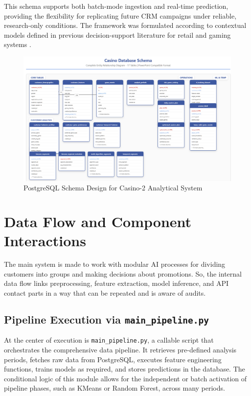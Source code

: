 \documentclass[12pt,a4paper]{report}
\begin{document}
This schema supports both batch-mode ingestion and real-time prediction, providing the flexibility for replicating future CRM campaigns under reliable, research-only conditions.  The framework was formulated according to contextual models defined in previous decision-support literature for retail and gaming systems \citep{Ghaharian2022a, Abarbanel2022}.

\begin{figure}[H]
\centering
\includegraphics[width=\textwidth]{figures/casino_db_diagram.png}
\caption{PostgreSQL Schema Design for Casino-2 Analytical System}
\label{fig:casino_schema}
\end{figure}


\section{Data Flow and Component Interactions}

The main system is made to work with modular AI processes for dividing customers into groups and making decisions about promotions.  So, the internal data flow links preprocessing, feature extraction, model inference, and API contact parts in a way that can be repeated and is aware of audits.

\subsection{Pipeline Execution via \texttt{main\_pipeline.py}}

At the center of execution is \texttt{main\_pipeline.py}, a callable script that orchestrates the comprehensive data pipeline. It retrieves pre-defined analysis periods, fetches raw data from PostgreSQL, executes feature engineering functions, trains models as required, and stores predictions in the database.  The conditional logic of this module allows for the independent or batch activation of pipeline phases, such as KMeans or Random Forest, across many periods.
\end{document}
